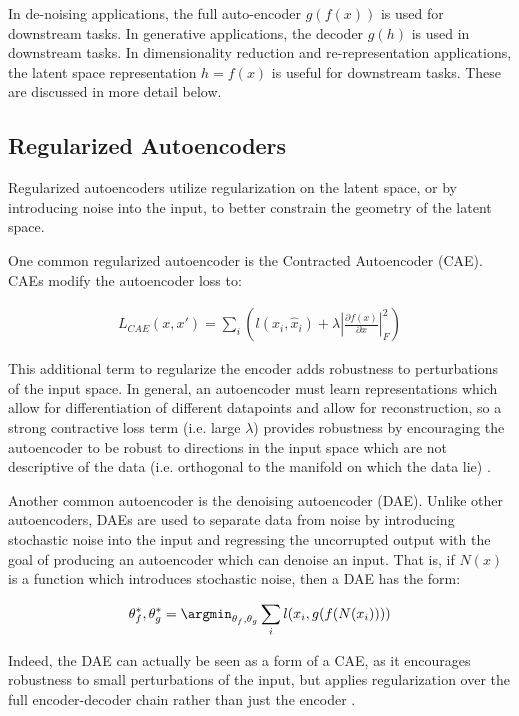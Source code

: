 In de-noising applications, the full auto-encoder $g(f(x))$ is used
for downstream tasks. In generative applications, the decoder $g(h)$
is used in downstream tasks. In dimensionality reduction and
re-representation applications, the latent space representation
$h=f(x)$ is useful for downstream tasks. These are discussed in more
detail below.


\subsection{Regularized Autoencoders}

Regularized autoencoders utilize regularization on the latent space,
or by introducing noise into the input, to better constrain the
geometry of the latent space.

One common regularized autoencoder is the Contracted Autoencoder
(CAE). CAEs modify the autoencoder loss to:

\begin{align*}
    L_{CAE}(x, x') = \sum_i \left ( l(x_i, \hat{x}_i) + \lambda \left | \frac{\partial f(x)}{\partial x} \right |^2_F \right )
\end{align*}

This additional term to regularize the encoder adds robustness to
perturbations of the input space. In general, an autoencoder must
learn representations which allow for differentiation of different
datapoints and allow for reconstruction, so a strong contractive loss
term (i.e. large $\lambda$) provides robustness by encouraging the
autoencoder to be robust to directions in the input space which are
not descriptive of the data (i.e. orthogonal to the manifold on which
the data lie) \cite{alain2014regularized}.


Another common autoencoder is the denoising autoencoder (DAE). Unlike
other autoencoders, DAEs are used to separate data from noise by
introducing stochastic noise into the input and regressing the
uncorrupted output with the goal of producing an autoencoder which
can denoise an input. That is, if $N(x)$ is a function which
introduces stochastic noise, then a DAE has the form:

\begin{align*}
    \theta_f^*, \theta_g^* = \argmin_{\theta_f, \theta_g} \sum_i l(x_i, g(f(N(x_i))))
\end{align*}

Indeed, the DAE can actually be seen as a form of a CAE, as it
encourages robustness to small perturbations of the input, but
applies regularization over the full encoder-decoder chain rather
than just the encoder \cite{alain2014regularized}.



